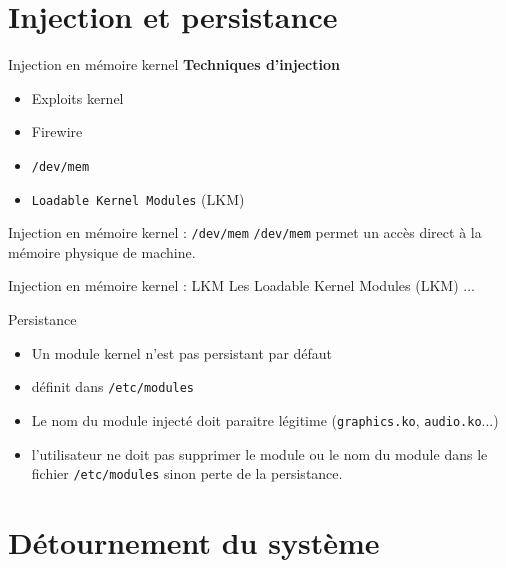 \documentclass[10pt]{beamer}
\begin{document}
\section{Injection et persistance}

	\begin{frame}{Injection en mémoire kernel}
		\textbf{Techniques d'injection}
		\begin{itemize}
			\item Exploits kernel
			\item Firewire
			\item\texttt{/dev/mem}
			\item \texttt{Loadable Kernel Modules} (LKM)
		\end{itemize}
	\end{frame}

	\begin{frame}{Injection en mémoire kernel : \texttt{/dev/mem}}
		\texttt{/dev/mem} permet un accès direct à la mémoire physique de machine.
	\end{frame}

	\begin{frame}{Injection en mémoire kernel : LKM}
		Les Loadable Kernel Modules (LKM) ...
	\end{frame}

	\begin{frame}{Persistance}
		
		\begin{itemize}
			\item Un module kernel n'est pas persistant par défaut
			\item définit dans \texttt{/etc/modules}
			\item Le nom du module injecté doit paraitre légitime (\texttt{graphics.ko}, \texttt{audio.ko}...)
			\item \alert{l'utilisateur ne doit pas supprimer le module ou le nom du module dans le fichier \texttt{/etc/modules} sinon perte de la persistance}.
		\end{itemize}

		
		
	\end{frame}


\section{Détournement du système}
\end{document}
